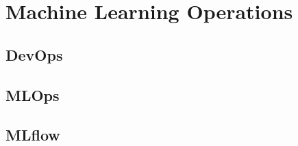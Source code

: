 
\section{Machine Learning Operations}

\subsection{DevOps}


\subsection{MLOps}

\subsection{MLflow}